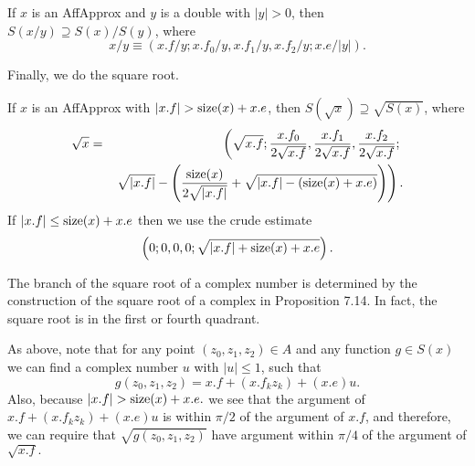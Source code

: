  If $x$ is an {\rm AffApprox}  and $y$ is a double
with $|y| > 0${\rm ,} then $S(x / y) \supseteq S(x) / S(y)${\rm ,} where
$$
x / y \equiv (x.f / y; x.f_0 / y, 
x.f_1 / y, x.f_2 / y; 
x.e/ |y| ).
$$
\endproclaim

Finally, we do the square root.

 If $x$ is an {\rm AffApprox}  with $|x.f| > {\rm size}(x) + x.e${\rm ,}
 then $S(\sqrt x)
\supseteq
\sqrt {S(x)}${\rm ,} where
\begin{eqnarray*}
\sqrt x& = &\left(\sqrt {x.f}; 
 {x.f_0 \over 2 \sqrt {x.f}}, 
 {x.f_1 \over 2 \sqrt {x.f}}, 
 {x.f_2 \over 2 \sqrt {x.f}};
\right.\\
&& \left. \sqrt {|x.f|} - \left({{\rm size}(x) \over 2 \sqrt {|x.f|}} + \sqrt {|x.f| - ({\rm size}(x) + x.e)}\right)
                                              \right).
\end{eqnarray*}
\endproclaim 
If $|x.f| \le {\rm size}(x) + x.e$ then we use the crude estimate $$\left(0;0,0,0;\sqrt{|x.f| + {\rm size}(x) + x.e}\right).$$
 
The branch of the square root of a complex number is determined by the construction of the square root of a complex in Proposition 7.14.  In fact, the square root is in the first or fourth quadrant.

As above, note that for any point $(z_0, z_1, z_2) \in A$ and any function $g \in S(x)$ we can find a complex number $u$ with 
$|u|   \le 1$, such that
$$ g(z_0, z_1, z_2) = x.f + (x.f_k z_k) + (x.e) u.$$
Also, because $|x.f| > {\rm size}(x) + x.e.$ we see that the argument of
$x.f + (x.f_k z_k) + (x.e) u$ is within $\pi/2$ of the argument of 
$x.f$, and therefore, we can require that $\sqrt{g(z_0,z_1,z_2)}$ have argument within $\pi/4$ of the argument of $\sqrt{x.f}.$

